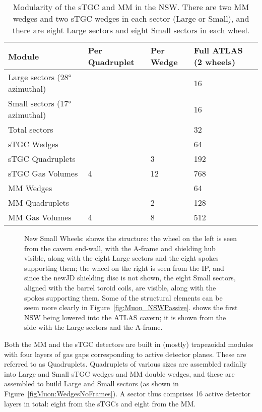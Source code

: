 \documentclass[cernpreprint, atlasdraft=false, UKenglish,british,orcidlogo, texmf, orcidlogo]{atlasdoc}
\begin{document}
\begin{table}[h!]
\caption[Modularity of NSW components]{Modularity of the \gls{sTGC} and \gls{MM} in the \gls{NSW}. There are two \gls{MM} wedges and two \gls{sTGC} wedges in each sector (Large or Small), and there are eight Large sectors and eight Small sectors in each wheel.
\label{table:Muon_modularity}
}
\centering
\begin{tabular}{llll}
\hline
Module & Per Quadruplet & Per Wedge & Full ATLAS (2 wheels)\\[0.5ex]
\hline
Large sectors (\ang{28} azimuthal) &  &  & 16 \\
Small sectors (\ang{17} azimuthal) &  &  & 16 \\
Total sectors & & & 32 \\
\gls{sTGC} Wedges & & & 64 \\
\gls{sTGC} Quadruplets & & 3 & 192 \\
\gls{sTGC} Gas Volumes & 4 & 12 & 768\\
\gls{MM} Wedges & & & 64\\
\gls{MM} Quadruplets & & 2 & 128\\
\gls{MM} Gas Volumes & 4 & 8 & 512\\[1ex]
\hline
\end{tabular}
\end{table}
 
\begin{figure}[!h]
\hfil
{}
\caption[New Small Wheels]{New Small Wheels:  shows the structure: the wheel on the left is seen from the cavern end-wall, with the A-frame and shielding hub visible, along with the eight Large sectors and the eight spokes supporting them; the wheel on the right is seen from the \gls{IP}, and since the \gls{newJD} shielding disc is not shown, the eight Small sectors, aligned with the barrel toroid coils, are visible, along with the spokes supporting them. Some of the structural elements can be seem more clearly in Figure~\protect\ref{fig:Muon_NSWPassive}.
 shows the first \gls{NSW} being lowered into the ATLAS cavern; it is shown from the side with the Large sectors and the A-frame.  \label{fig:Muon_NSW}}
\end{figure}
 
Both the \gls{MM} and the \gls{sTGC} detectors are built in (mostly) trapezoidal modules with four layers of gas gaps corresponding to active detector planes. These are referred to as Quadruplets. Quadruplets of various sizes are assembled radially into Large and Small \gls{sTGC} wedges and \gls{MM} double wedges, and these are assembled to build Large and Small sectors (as shown in Figure~\ref{figMuon:WedgesNoFrames}). A sector thus comprises \num{16} active detector layers in total: eight from the \glspl{sTGC} and eight from the \gls{MM}.
 
\end{document}
